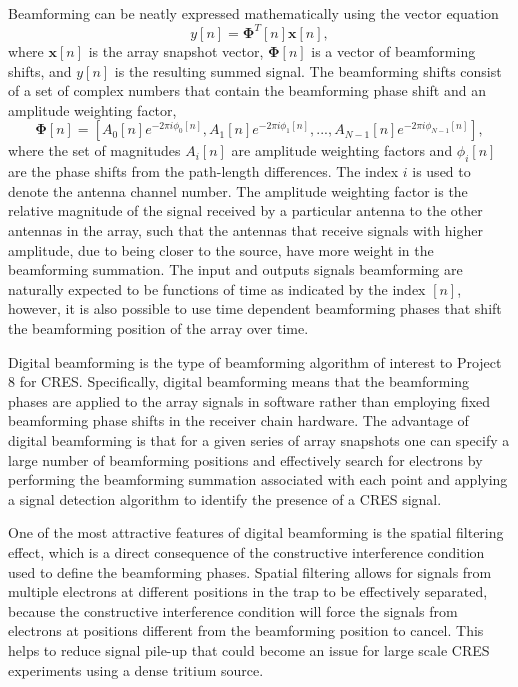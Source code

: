 Beamforming can be neatly expressed mathematically using the vector equation
\begin{equation}
    y[n] = \bm{\Phi}^T[n]\bm{x}[n],
\end{equation}
where $\bm{x}[n]$ is the array snapshot vector, $\bm{\Phi}[n]$ is a vector of beamforming shifts, and $y[n]$ is the resulting summed signal. The beamforming shifts consist of a set of complex numbers that contain the beamforming phase shift and an amplitude weighting factor,
\begin{equation}
    \bm{\Phi}[n] = \left[A_0[n]e^{-2\pi i\phi_0[n]}, A_1[n]e^{-2\pi i \phi_1[n]}, ..., A_{N-1}[n]e^{-2\pi i \phi_{N-1}[n]}\right],
\end{equation}
where the set of magnitudes $A_i[n]$ are amplitude weighting factors and $\phi_i[n]$ are the phase shifts from the path-length differences. The index $i$ is used to denote the antenna channel number. The amplitude weighting factor is the relative magnitude of the signal received by a particular antenna to the other antennas in the array, such that the antennas that receive signals with higher amplitude, due to being closer to the source, have more weight in the beamforming summation. The input and outputs signals beamforming are naturally expected to be functions of time as indicated by the index $[n]$, however, it is also possible to use time dependent beamforming phases that shift the beamforming position of the array over time.

Digital beamforming is the type of beamforming algorithm of interest to Project 8 for CRES. Specifically, digital beamforming means that the beamforming phases are applied to the array signals in software rather than employing fixed beamforming phase shifts in the receiver chain hardware. The advantage of digital beamforming is that for a given series of array snapshots one can specify a large number of beamforming positions and effectively search for electrons by performing the beamforming summation associated with each point and applying a signal detection algorithm to identify the presence of a CRES signal.

One of the most attractive features of digital beamforming is the spatial filtering effect, which is a direct consequence of the constructive interference condition used to define the beamforming phases. Spatial filtering allows for signals from multiple electrons at different positions in the trap to be effectively separated, because the constructive interference condition will force the signals from electrons at positions different from the beamforming position to cancel. This helps to reduce signal pile-up that could become an issue for large scale CRES experiments using a dense tritium source.

